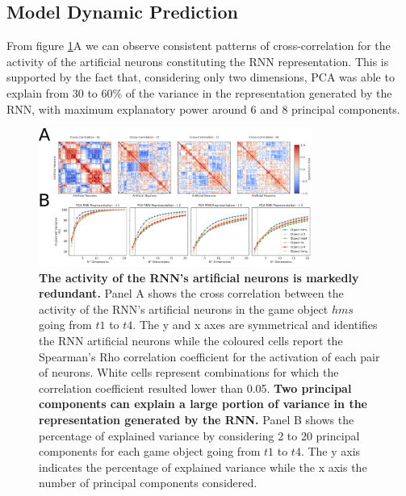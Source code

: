\subsection{Model Dynamic Prediction}
From figure \ref{pca_emb}A we can observe consistent patterns of cross-correlation for the activity of the artificial neurons constituting the RNN representation. This is supported by the fact that, considering only two dimensions, PCA was able to explain from 30 to 60\% of the variance in the representation generated by the RNN, with maximum explanatory power around 6 and 8 principal components.
\begin{figure}[h]
\centering
\includegraphics[width=0.8\textwidth]{images/chapter_4/pca_repr_42.png}
\caption{\textbf{The activity of the RNN's artificial neurons is markedly redundant.} Panel A shows the cross correlation between the activity of the RNN's artificial neurons in the game object $hms$ going from $t1$ to $t4$. The y and x axes are symmetrical and identifies the RNN artificial neurons while the coloured cells report the Spearman's Rho correlation coefficient for the activation of each pair of neurons. White cells represent combinations for which the correlation coefficient resulted lower than 0.05. \textbf{Two principal components can explain a large portion of variance in the representation generated by the RNN.} Panel B shows the percentage of explained variance by considering 2 to 20 principal components for each game object going from $t1$ to $t4$. The y axis indicates the percentage of explained variance while the x axis the number of principal components considered.}
\label{pca_emb} 
\end{figure}

